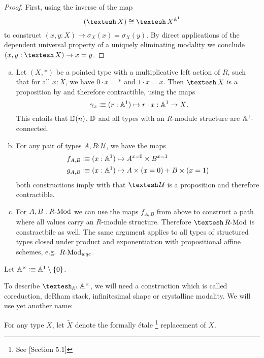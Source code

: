 \begin{proof}
  First, using the inverse of the map
  \[
    (\shape X) \cong  \shape X^{\A^1}
  \]
  to construct $(x,y:X)\to \sigma_X(x)=\sigma_X(y)$.
  By direct applications of the dependent universal property of a uniquely eliminating modality we conclude
  $(x,y:\shape X)\to x=y$.
\end{proof}

\begin{example}
  \label{basic-A1-connected-types}
  \begin{enumerate}[(a)]
  \item Let $(X,*)$ be a pointed type with a multiplicative left action of $R$,
    such that for all $x:X$, we have $0\cdot x=*$ and $1\cdot x=x$.
    Then $\shape X$ is a proposition by  and therefore contractible,
    using the maps
    \[
    \gamma_x\colonequiv (r:\A^1)\mapsto r\cdot x : \A^1\to X
    \rlap{.}
    \]
    This entails that $\mathbb{D}(n)$, $\mathbb{D}$ and all types with an $R$-module structure are $\mathbb{A}^1$-connected.
  \item For any pair of types $A,B:\mathcal U$, we have the maps
    \begin{align*}
      f_{A,B}&\vcentcolon\mspace{-1.2mu}\equiv (x:\mathbb{A}^1)\mapsto A^{x=0}\times B^{x=1} \\
      g_{A,B}&\vcentcolon\mspace{-1.2mu}\equiv (x:\mathbb{A}^1)\mapsto A\times (x=0) + B\times(x=1)
    \end{align*}
    both constructions imply with 
    that $\shape \mathcal U$ is a proposition and therefore contractible.
  \item For $A,B:R\text{-}\mathrm{Mod}$ we can use the maps $f_{A,B}$ from above to construct a path
    where all values carry an $R$-module structure.
    Therefore $\shape \Mod{R}$ is constractbile as well.
    The same argument applies to all types of structured types closed under product
    and exponentiation with propositional affine schemes, e.g.\ $R\text{-}\mathrm{Mod}_{wqc}$.
  \end{enumerate}
\end{example}

\begin{definition}
  Let $\mathbb{A}^\times\vcentcolon\mspace{-1.2mu}\equiv \mathbb{A}^1\setminus\{0\}$.
\end{definition}

To describe $\shape_{\A^1}\A^\times$,
we will need a construction which is called coreduction, deRham stack, infinitesimal shape or crystalline modality. We will use yet another name:

\begin{definition}
  For any type $X$, let $\widetilde{X}$ denote the formally étale
  \footnote{See \cite{etale-draft}[Section 5.1]}
  replacement of $X$.
\end{definition}

